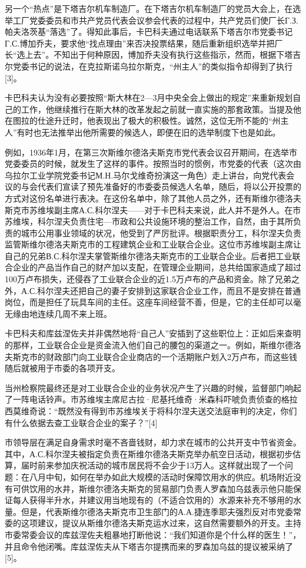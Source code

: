 另一个“热点”是下塔吉尔机车制造厂。在下塔吉尔机车制造厂的党员大会上，在选举工厂党委委员和市共产党员代表会议参会代表的过程中，共产党员们使厂长Г.З.帕夫洛茨基“落选”了。得知此事后，卡巴科夫通过电话联系下塔吉尔市党委书记Г.С.博加乔夫，要求他“找点理由”来否决投票结果，随后重新组织选举并把厂长“选上去”。不知出于何种原因，博加乔夫没有执行这些指示，然而，根据下塔吉尔党委书记的说法，在克拉斯诺乌拉尔斯克，“州主人”的类似指令却得到了执行[3]。

卡巴科夫认为没有必要按照“斯大林在2—3月中央全会上做出的规定”来重新规划自己的工作，他继续推行在斯大林的改革发起之前就一直实施的那套政策。当提及他在图拉的仕途升迁时，他表现出了极大的积极性。诚然，这位无所不能的“州主人”有时也无法推举出他所需要的候选人，即便在旧的选举制度下也是如此。

例如，1936年1月，在第三次斯维尔德洛夫斯克市党代表会议召开期间，在选举市党委委员的时候，就发生了这样的事件。按照当时的惯例，市党委的代表（这次由乌拉尔工业学院党委书记М.Н.马尔戈维奇扮演这一角色）走上讲台，向党代表会议的与会代表们宣读了预先准备好的市委委员候选人名单，随后，将以公开投票的方式对这份名单进行表决。在这份名单中，除了其他人员之外，还有斯维尔德洛夫斯克市苏维埃副主席А.С.科尔涅夫——对于卡巴科夫来说，此人并不是外人。在市苏维埃，科尔涅夫负责住宅—市政和公共设施环境的整治工作，自然，由于其所负责的城市公用事业领域的状况，他受到了严厉批评。根据职责分工，科尔涅夫负责监管斯维尔德洛夫斯克市的工程建筑企业和工业联合企业。这位市苏维埃副主席让自己的兄弟В.С.科尔涅夫掌管斯维尔德洛夫斯克市的工业联合企业。后者把工业联合企业的产品当作自己的财产加以支配，在管理企业期间，总共给国家造成了超过100万卢布损失，还侵吞了工业联合企业的近1.5万卢布的产品和资金。除了兄弟之外，А.С.科尔涅夫还把自己的妻子安排到这家联合企业工作，而且不是安排在普通岗位，而是担任了玩具车间的主任。这座车间经营不善，但是，它的主任却可以毫无缘由地连续几周不来上班。

卡巴科夫和库兹涅佐夫并非偶然地将“自己人”安插到了这些职位上：正如后来查明的那样，工业联合企业是资金流入他们自己的腰包的渠道之一。例如，斯维尔德洛夫斯克市的财政部门向工业联合企业商店的一个活期账户划入2万卢布，而这些钱随后就被用于市委的各项开支。

当州检察院最终还是对工业联合企业的业务状况产生了兴趣的时候，监督部门响起了一阵电话铃声。市苏维埃主席尼古拉·尼基托维奇·米森科吓唬负责侦查的格拉西莫维奇说：“既然没有得到市苏维埃关于将科尔涅夫送交法庭审判的决定，你们有什么依据去查工业联合企业的案子？”[4]

市领导层在满足自身需求时毫不吝啬钱财，却力求在城市的公共开支中节省资金。其中，А.С.科尔涅夫被指定负责在斯维尔德洛夫斯克举办航空日活动，根据初步估算，届时前来参加庆祝活动的城市居民将不会少于13万人。这样就出现了一个问题：在八月中旬，如何在举办如此大规模的活动时保障饮用水的供应。机场附近没有可供饮用的水井，斯维尔德洛夫斯克的贸易部门负责人罗森加乌兹表示他只能保证每人获得半升水，并建议用当地现有的（不适合饮用的）水源来补充不够用的水量。但是，代表斯维尔德洛夫斯克市卫生部门的А.А.捷连季耶夫强烈反对市党委常委的这项建议，提议从斯维尔德洛夫斯克运水过来，这自然需要额外的开支。主持市委常委会议的库兹涅佐夫粗暴地打断他说：“我们知道你是个什么样的医生！”，并且命令他闭嘴。库兹涅佐夫从下塔吉尔提携而来的罗森加乌兹的提议被采纳了[5]。

